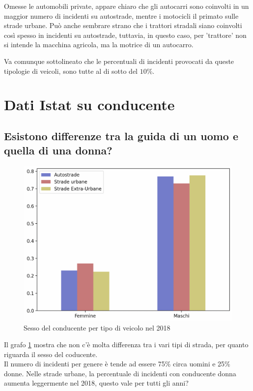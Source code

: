 \documentclass[a4paper]{report}
\begin{document}
Omesse le automobili private, appare chiaro che gli autocarri sono coinvolti in un maggior 
numero di incidenti su autostrade, mentre i motocicli il primato sulle strade urbane.
Può anche sembrare strano che i trattori stradali siano coinvolti così spesso in incidenti su autostrade, 
tuttavia, in questo caso, per 'trattore' non si intende la macchina agricola, 
ma la motrice di un autocarro.

Va comunque sottolineato che le percentuali di incidenti provocati da queste tipologie di veicoli, 
sono tutte al di sotto del $10$\%.

\section{Dati Istat su conducente}

\subsection{Esistono differenze tra la guida di un uomo e quella di una donna?}

\begin{figure}
    \includegraphics[width=\linewidth]{../src/incidenti/incidenti_senza_coords/tipo_veicoli/uomo-donna.png}
    \caption{Sesso del conducente per tipo di veicolo nel 2018}
    \label{fig:differenza-uomo-donna}
\end{figure}

Il grafo \ref{fig:differenza-uomo-donna} mostra che non c'è molta differenza tra i vari tipi di 
strada, per quanto riguarda il sesso del coducente.\\
Il numero di incidenti per genere è tende ad essere 75\% circa uomini e 25\% donne.
Nelle strade  urbane, la percentuale di incidenti con conducente donna aumenta leggermente nel 2018, 
questo vale per tutti gli anni?
\end{document}
